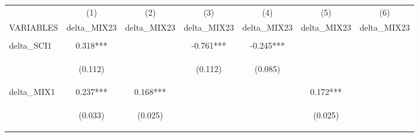 \begin{center}
\begin{tabular}{lcccccc} \hline
 & (1) & (2) & (3) & (4) & (5) & (6) \\
VARIABLES & delta\_MIX23 & delta\_MIX23 & delta\_MIX23 & delta\_MIX23 & delta\_MIX23 & delta\_MIX23 \\ \hline
\vspace{4pt} & \begin{footnotesize}\end{footnotesize} & \begin{footnotesize}\end{footnotesize} & \begin{footnotesize}\end{footnotesize} & \begin{footnotesize}\end{footnotesize} & \begin{footnotesize}\end{footnotesize} & \begin{footnotesize}\end{footnotesize} \\
delta\_SCI1 & 0.318*** &  & -0.761*** & -0.245*** &  &  \\
\vspace{4pt} & \begin{footnotesize}(0.112)\end{footnotesize} & \begin{footnotesize}\end{footnotesize} & \begin{footnotesize}(0.112)\end{footnotesize} & \begin{footnotesize}(0.085)\end{footnotesize} & \begin{footnotesize}\end{footnotesize} & \begin{footnotesize}\end{footnotesize} \\
delta\_MIX1 & 0.237*** & 0.168*** &  &  & 0.172*** &  \\
\vspace{4pt} & \begin{footnotesize}(0.033)\end{footnotesize} & \begin{footnotesize}(0.025)\end{footnotesize} & \begin{footnotesize}\end{footnotesize} & \begin{footnotesize}\end{footnotesize} & \begin{footnotesize}(0.025)\end{footnotesize} & \begin{footnotesize}\end{footnotesize} \\

\end{tabular}
\end{center}
